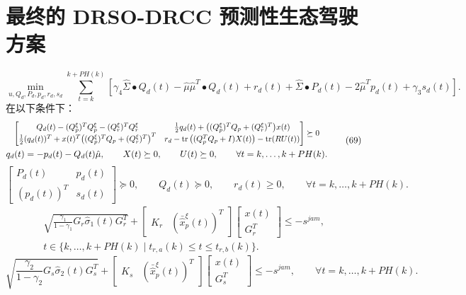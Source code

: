 \documentclass[10pt]{article}
\begin{document}
\section*{最终的 DRSO-DRCC 预测性生态驾驶方案}
\begin{equation}
\min_{u,Q_d,P_d,p_d,r_d,s_d}\sum_{t=k}^{k+PH(k)}
\left[\gamma_4\hat\Sigma\bullet Q_d(t)-\hat\mu\hat\mu^T\bullet Q_d(t)+r_d(t)+\hat\Sigma\bullet P_d(t)-2\hat\mu^Tp_d(t)+\gamma_3s_d(t)\right].
\tag{68}
\end{equation}
在以下条件下：
\begin{equation}
\begin{gathered}
\resizebox{0.98\textwidth}{!}{$\displaystyle
\begin{bmatrix}
Q_d(t)-(Q_p^\xi)^TQ_p^\xi-(Q_r^\xi)^TQ_r^\xi &
\frac12q_d(t)+\big((Q_p^\xi)^TQ_p+(Q_r^\xi)^T\big)x(t)\\
\frac12(q_d(t))^T+x(t)^T\big((Q_p^\xi)^TQ_p+(Q_r^\xi)^T\big)^T &
r_d-\operatorname{tr}\big((Q_p^TQ_p+I)X(t)\big)-\operatorname{tr}(RU(t))
\end{bmatrix}\succeq0$}\\
q_d(t)=-p_d(t)-Q_d(t)\hat\mu,\qquad X(t)\succeq0,\qquad U(t)\succeq0,
\qquad\forall t=k,\ldots,k+PH(k).
\end{gathered}
\tag{69}
\end{equation}
\begin{equation}
\begin{bmatrix}P_d(t)&p_d(t)\\(p_d(t))^T&s_d(t)\end{bmatrix}\succeq0,
\qquad Q_d(t)\succeq0,\qquad r_d(t)\geq0,
\qquad\forall t=k,\ldots,k+PH(k).
\tag{70}
\end{equation}
\begin{equation}
\begin{gathered}
\sqrt{\frac{\gamma_1}{1-\gamma_1}G_r\hat\sigma_1(t)G_r^T}
+\begin{bmatrix}K_r&(\bar{\hat{x}}_p^\xi(t))^T\end{bmatrix}
\begin{bmatrix}x(t)\\G_r^T\end{bmatrix}\leq-s^{jam},\\
t\in\{k,\ldots,k+PH(k)\mid t_{r,a}(k)\leq t\leq t_{r,b}(k)\}.
\end{gathered}
\tag{71}
\end{equation}
\begin{equation}
\sqrt{\frac{\gamma_2}{1-\gamma_2}G_s\hat\sigma_2(t)G_s^T}
+\begin{bmatrix}K_s&(\bar{\hat{x}}_p^\xi(t))^T\end{bmatrix}
\begin{bmatrix}x(t)\\G_s^T\end{bmatrix}\leq-s^{jam},
\qquad\forall t=k,\ldots,k+PH(k).
\tag{72}
\end{equation}
\end{document}
